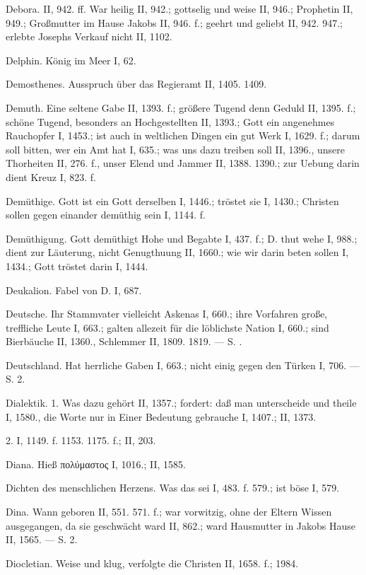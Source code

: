 Debora. II, 942. ff. War heilig II, 942.; gottselig und weise II, 946.; Prophetin II, 949.; Großmutter im Hause Jakobs II, 946. f.; geehrt und geliebt II, 942. 947.; erlebte Josephs Verkauf nicht II, 1102.

Delphin. König im Meer I, 62.

Demosthenes. Ausspruch über das Regieramt II, 1405. 1409.

Demuth. Eine seltene Gabe II, 1393. f.; größere Tugend denn Geduld II, 1395. f.; schöne Tugend, besonders an Hochgestellten II, 1393.; Gott ein angenehmes Rauchopfer I, 1453.; ist auch in weltlichen Dingen ein gut Werk I, 1629. f.; darum soll bitten, wer ein Amt hat I, 635.; was uns dazu treiben soll II, 1396., unsere Thorheiten II, 276. f., unser Elend und Jammer II, 1388. 1390.; zur Uebung darin dient Kreuz I, 823. f.

Demüthige. Gott ist ein Gott derselben I, 1446.; tröstet sie I, 1430.; Christen sollen gegen einander demüthig sein I, 1144. f.

Demüthigung. Gott demüthigt Hohe und Begabte I, 437. f.; D. thut wehe I, 988.; dient zur Läuterung, nicht Genugthuung II, 1660.; wie wir darin beten sollen I, 1434.; Gott tröstet darin I, 1444.

Deukalion. Fabel von D. I, 687.

Deutsche. Ihr Stammvater vielleicht Askenas I, 660.; ihre Vorfahren große, treffliche Leute I, 663.; galten allezeit für die löblichste Nation I, 660.; sind Bierbäuche II, 1360., Schlemmer II, 1809. 1819. — S. .

Deutschland. Hat herrliche Gaben I, 663.; nicht einig gegen den Türken I, 706. — S.  2.

Dialektik. 1. Was dazu gehört II, 1357.; fordert: daß man unterscheide und theile I, 1580., die Worte nur in Einer Bedeutung gebrauche I, 1407.; II, 1373.

2.  I, 1149. f. 1153. 1175. f.; II, 203.

Diana. Hieß πολύμαστος I, 1016.; II, 1585.

Dichten des menschlichen Herzens. Was das sei I, 483. f. 579.; ist böse I, 579.

Dina. Wann geboren II, 551. 571. f.; war vorwitzig, ohne der Eltern Wissen ausgegangen, da sie geschwächt ward II, 862.; ward Hausmutter in Jakobs Hause II, 1565. — S.  2.

Diocletian. Weise und klug, verfolgte die Christen II, 1658. f.; 1984.

